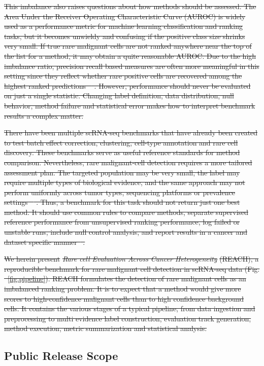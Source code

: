 \documentclass[10pt]{article}
\providecommand{\DIFaddtex}[1]{{\protect\color{trackgreen}#1}} %
\providecommand{\DIFdeltex}[1]{{\protect\color{red}\sout{#1}}}                      %
\providecommand{\DIFaddbegin}{} %
\providecommand{\DIFaddend}{} %
\providecommand{\DIFdelbegin}{} %
\providecommand{\DIFdelend}{} %
\providecommand{\DIFadd}[1]{\texorpdfstring{\DIFaddtex{#1}}{#1}} %
\providecommand{\DIFdel}[1]{\texorpdfstring{\DIFdeltex{#1}}{}} %
\newcommand{\DIFscaledelfig}{0.5}
\newlength{\DIFdelgraphicswidth} %
\newlength{\DIFdelgraphicsheight} %
\newcommand{\DIFaddincludegraphics}[2][]{{\color{trackgreen}\fbox{\DIFOincludegraphics[#1]{#2}}}} %
\newcommand{\DIFdelincludegraphics}[2][]{%
\sbox{\DIFdelgraphicsbox}{\DIFOincludegraphics[#1]{#2}}%
\settoboxwidth{\DIFdelgraphicswidth}{\DIFdelgraphicsbox} %
\settoboxtotalheight{\DIFdelgraphicsheight}{\DIFdelgraphicsbox} %
\scalebox{\DIFscaledelfig}{%
\parbox[b]{\DIFdelgraphicswidth}{\usebox{\DIFdelgraphicsbox}\\[-\baselineskip] \rule{\DIFdelgraphicswidth}{0em}}\llap{\resizebox{\DIFdelgraphicswidth}{\DIFdelgraphicsheight}{%
\setlength{\unitlength}{\DIFdelgraphicswidth}%
\begin{picture}(1,1)%
\thicklines\linethickness{2pt} %
{\color[rgb]{1,0,0}\put(0,0){\framebox(1,1){}}}%
{\color[rgb]{1,0,0}\put(0,0){\line( 1,1){1}}}%
{\color[rgb]{1,0,0}\put(0,1){\line(1,-1){1}}}%
\end{picture}%
}\hspace*{3pt}}} %
} %
\DeclareRobustCommand{\DIFaddbegin}{\DIFOaddbegin \let\includegraphics\DIFaddincludegraphics} %
\DeclareRobustCommand{\DIFaddend}{\DIFOaddend \let\includegraphics\DIFOincludegraphics} %
\DeclareRobustCommand{\DIFdelbegin}{\DIFOdelbegin \let\includegraphics\DIFdelincludegraphics} %
\DeclareRobustCommand{\DIFdelend}{\DIFOaddend \let\includegraphics\DIFOincludegraphics} %
\begin{document}
\DIFdel{This imbalance also raises questions about how methods should be assessed. The Area Under the Receiver Operating Characteristic Curve (AUROC) is widely used as a performance metric for machine learning classification and ranking tasks, but it becomes unwieldy and confusing if the positive class size shrinks very small. If true rare malignant cells are not ranked anywhere near the top of the list for a method, it may obtain a quite reasonable AUROC. Due to the high imbalance ratio, precision recall based measures are often more meaningful in this setting since they reflect whether rare positive cells are recovered among the highest ranked predictions \mbox{%
\cite{davis2006relationship,saito2015precision}}\hskip0pt%
. However, performance should never be evaluated on just a single statistic. Changing label definition, data distribution, null behavior, method failure and statistical error makes how to interpret benchmark results a complex matter.
}%

\DIFdel{There have been multiple scRNA-seq benchmarks that have already been created to test batch effect correction, clustering, cell-type annotation and rare cell discovery. These benchmarks serve as useful reference standards for method comparison. Nevertheless, rare malignant-cell detection requires a more tailored assessment plan. The targeted population may be very small, the label may require multiple types of biological evidence, and the same approach may not perform uniformly across tumor types, sequencing platforms or prevalence settings \mbox{%
\cite{tran2020benchmark,wang2022comparison,tian2019benchmarking,abdelaal2019comparison}}\hskip0pt%
. Thus, a benchmark for this task should not return just one best method. It should use common rules to compare methods, separate supervised reference performance from unsupervised ranking performance, log failed or unstable runs, include null control analysis, and report results in a cancer and dataset specific manner\mbox{%
\cite{cao2021benchmark}}\hskip0pt%
.
}\DIFdelend \DIFaddbegin \begin{center}\DIFadd{\rule{0.5\linewidth}{0.5pt}}\end{center}
\DIFaddend 

\DIFdelbegin \DIFdel{We herein present }\textit{\DIFdel{Rare cell Evaluation Across Cancer Heterogeneity}} %
\DIFdel{(REACH), a reproducible benchmark for rare malignant cell detection in scRNA-seq data (Fig. ~\ref{fig:pipeline}). REACH formulates the detection of rare malignant cells as an imbalanced ranking problem. It is to expect that a method would give more scores to high-confidence malignant cells than to high confidence background cells. It contains the various stages of a typical pipeline, from data ingestion and preprocessing to multi evidence label construction, evaluation track generation, method execution, metric summarization and statistical analysis.
}\DIFdelend \DIFaddbegin \subsection{\DIFadd{Public Release Scope}}\label{public-release-scope}
\DIFaddend 
\end{document}
